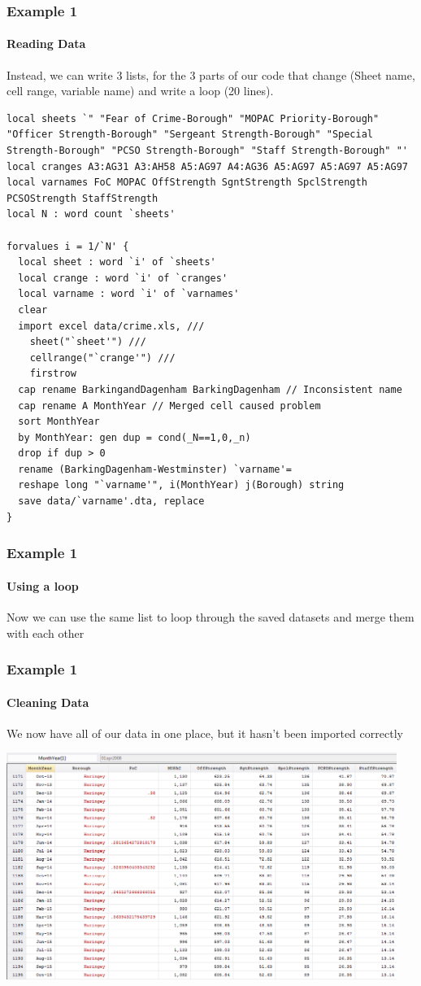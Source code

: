\documentclass{beamer}
\begin{document}
\begin{frame}[fragile]
  \frametitle{Example 1}
  \framesubtitle{Reading Data}
Instead, we can write 3 lists, for the 3 parts of our code that change (Sheet name, cell range, variable name) and write a loop (20 lines).

\tiny
\begin{verbatim}
local sheets `" "Fear of Crime-Borough" "MOPAC Priority-Borough" "Officer Strength-Borough" "Sergeant Strength-Borough" "Special Strength-Borough" "PCSO Strength-Borough" "Staff Strength-Borough" "'	
local cranges A3:AG31 A3:AH58 A5:AG97 A4:AG36 A5:AG97 A5:AG97 A5:AG97
local varnames FoC MOPAC OffStrength SgntStrength SpclStrength PCSOStrength StaffStrength
local N : word count `sheets'

forvalues i = 1/`N' {
  local sheet : word `i' of `sheets'
  local crange : word `i' of `cranges'
  local varname : word `i' of `varnames'
  clear   
  import excel data/crime.xls, ///
    sheet("`sheet'") ///
    cellrange("`crange'") ///
    firstrow	
  cap rename BarkingandDagenham BarkingDagenham // Inconsistent name
  cap rename A MonthYear // Merged cell caused problem	
  sort MonthYear
  by MonthYear: gen dup = cond(_N==1,0,_n)
  drop if dup > 0
  rename (BarkingDagenham-Westminster) `varname'=
  reshape long "`varname'", i(MonthYear) j(Borough) string
  save data/`varname'.dta, replace
}
\end{verbatim}

\end{frame}

\begin{frame}[fragile]
  \frametitle{Example 1}
  \framesubtitle{Using a loop}
  Now we can use the same list to loop through the saved datasets and merge them with each other



\end{frame}


\begin{frame}
  \frametitle{Example 1}
  \framesubtitle{Cleaning Data}
We now have all of our data in one place, but it hasn't been imported correctly

\includegraphics[width=5in]{data2.PNG}

\end{frame}
\end{document}
